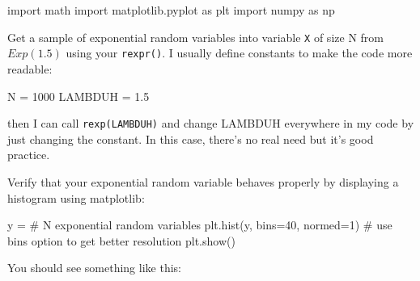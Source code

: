 \begin{fullwidth}
\begin{pyverbatim}
import math
import matplotlib.pyplot as plt
import numpy as np
\end{pyverbatim}

\step Get a sample of exponential random variables into variable {\tt X} of size N from $Exp(1.5)$ using your {\tt rexpr()}. I usually define constants to make the code more readable:

\begin{pyverbatim}
N = 1000
LAMBDUH = 1.5
\end{pyverbatim}

\noindent then I can call {\tt rexp(LAMBDUH)} and change LAMBDUH everywhere in my code by just changing the constant. In this case, there's no real need but it's good practice.

\step Verify that your exponential random variable behaves properly by displaying a histogram using matplotlib:

\begin{pyverbatim}
y = # N exponential random variables
plt.hist(y, bins=40, normed=1) # use bins option to get better resolution
plt.show()
\end{pyverbatim}

\noindent You should see something like this:


\\


\end{fullwidth}
